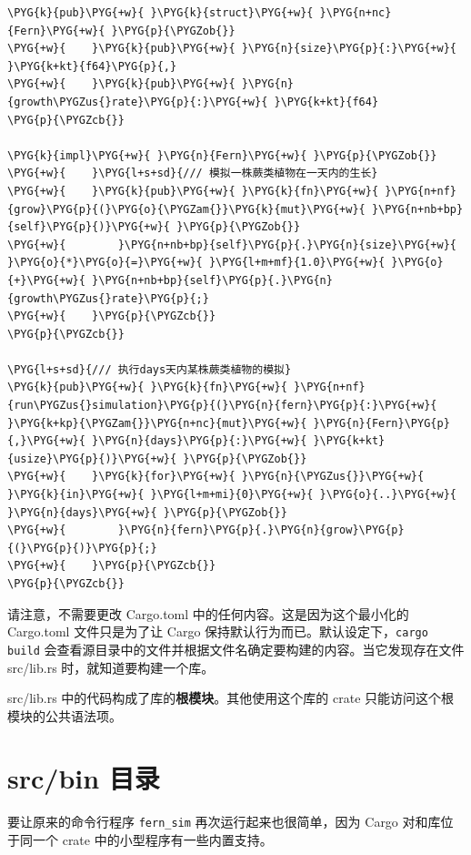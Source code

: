 \begin{Verbatim}[commandchars=\\\{\},breaklines=true,breakanywhere=true,fontsize=\codefont,xleftmargin=17bp]
\PYG{k}{pub}\PYG{+w}{ }\PYG{k}{struct}\PYG{+w}{ }\PYG{n+nc}{Fern}\PYG{+w}{ }\PYG{p}{\PYGZob{}}
\PYG{+w}{    }\PYG{k}{pub}\PYG{+w}{ }\PYG{n}{size}\PYG{p}{:}\PYG{+w}{ }\PYG{k+kt}{f64}\PYG{p}{,}
\PYG{+w}{    }\PYG{k}{pub}\PYG{+w}{ }\PYG{n}{growth\PYGZus{}rate}\PYG{p}{:}\PYG{+w}{ }\PYG{k+kt}{f64}
\PYG{p}{\PYGZcb{}}

\PYG{k}{impl}\PYG{+w}{ }\PYG{n}{Fern}\PYG{+w}{ }\PYG{p}{\PYGZob{}}
\PYG{+w}{    }\PYG{l+s+sd}{/// 模拟一株蕨类植物在一天内的生长}
\PYG{+w}{    }\PYG{k}{pub}\PYG{+w}{ }\PYG{k}{fn}\PYG{+w}{ }\PYG{n+nf}{grow}\PYG{p}{(}\PYG{o}{\PYGZam{}}\PYG{k}{mut}\PYG{+w}{ }\PYG{n+nb+bp}{self}\PYG{p}{)}\PYG{+w}{ }\PYG{p}{\PYGZob{}}
\PYG{+w}{        }\PYG{n+nb+bp}{self}\PYG{p}{.}\PYG{n}{size}\PYG{+w}{ }\PYG{o}{*}\PYG{o}{=}\PYG{+w}{ }\PYG{l+m+mf}{1.0}\PYG{+w}{ }\PYG{o}{+}\PYG{+w}{ }\PYG{n+nb+bp}{self}\PYG{p}{.}\PYG{n}{growth\PYGZus{}rate}\PYG{p}{;}
\PYG{+w}{    }\PYG{p}{\PYGZcb{}}
\PYG{p}{\PYGZcb{}}

\PYG{l+s+sd}{/// 执行days天内某株蕨类植物的模拟}
\PYG{k}{pub}\PYG{+w}{ }\PYG{k}{fn}\PYG{+w}{ }\PYG{n+nf}{run\PYGZus{}simulation}\PYG{p}{(}\PYG{n}{fern}\PYG{p}{:}\PYG{+w}{ }\PYG{k+kp}{\PYGZam{}}\PYG{n+nc}{mut}\PYG{+w}{ }\PYG{n}{Fern}\PYG{p}{,}\PYG{+w}{ }\PYG{n}{days}\PYG{p}{:}\PYG{+w}{ }\PYG{k+kt}{usize}\PYG{p}{)}\PYG{+w}{ }\PYG{p}{\PYGZob{}}
\PYG{+w}{    }\PYG{k}{for}\PYG{+w}{ }\PYG{n}{\PYGZus{}}\PYG{+w}{ }\PYG{k}{in}\PYG{+w}{ }\PYG{l+m+mi}{0}\PYG{+w}{ }\PYG{o}{..}\PYG{+w}{ }\PYG{n}{days}\PYG{+w}{ }\PYG{p}{\PYGZob{}}
\PYG{+w}{        }\PYG{n}{fern}\PYG{p}{.}\PYG{n}{grow}\PYG{p}{(}\PYG{p}{)}\PYG{p}{;}
\PYG{+w}{    }\PYG{p}{\PYGZcb{}}
\PYG{p}{\PYGZcb{}}
\end{Verbatim}

请注意，不需要更改 Cargo.toml 中的任何内容。这是因为这个最小化的 Cargo.toml 文件只是为了让 Cargo 保持默认行为而已。默认设定下，\texttt{cargo build} 会查看源目录中的文件并根据文件名确定要构建的内容。当它发现存在文件 src/lib.rs 时，就知道要构建一个库。

src/lib.rs 中的代码构成了库的\textbf{根模块}。其他使用这个库的 crate 只能访问这个根模块的公共语法项。

\section{src/bin 目录}

要让原来的命令行程序 \texttt{fern\_sim} 再次运行起来也很简单，因为 Cargo 对和库位于同一个 crate 中的小型程序有一些内置支持。

